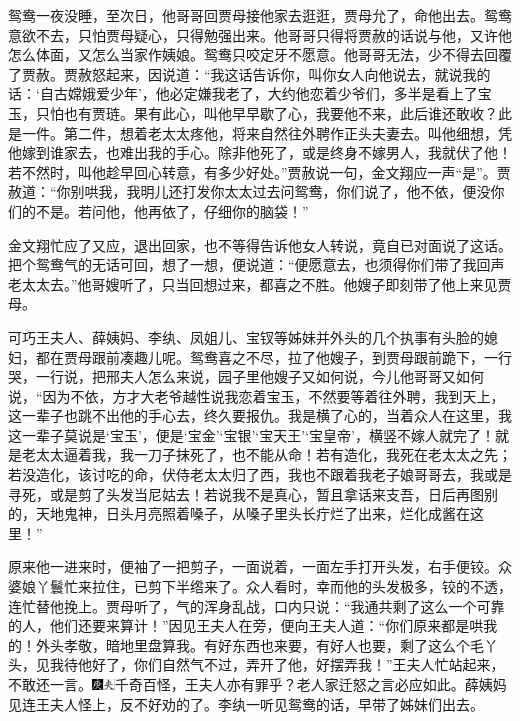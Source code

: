 鸳鸯一夜没睡，至次日，他哥哥回贾母接他家去逛逛，贾母允了，命他出去。鸳鸯意欲不去，只怕贾母疑心，只得勉强出来。他哥哥只得将贾赦的话说与他，又许他怎么体面，又怎么当家作姨娘。鸳鸯只咬定牙不愿意。他哥哥无法，少不得去回覆了贾赦。贾赦怒起来，因说道：“我这话告诉你，叫你女人向他说去，就说我的话：‘自古嫦娥爱少年’，他必定嫌我老了，大约他恋着少爷们，多半是看上了宝玉，只怕也有贾琏。果有此心，叫他早早歇了心，我要他不来，此后谁还敢收？此是一件。第二件，想着老太太疼他，将来自然往外聘作正头夫妻去。叫他细想，凭他嫁到谁家去，也难出我的手心。除非他死了，或是终身不嫁男人，我就伏了他！若不然时，叫他趁早回心转意，有多少好处。”贾赦说一句，金文翔应一声“是”。贾赦道：“你别哄我，我明儿还打发你太太过去问鸳鸯，你们说了，他不依，便没你们的不是。若问他，他再依了，仔细你的脑袋！”

金文翔忙应了又应，退出回家，也不等得告诉他女人转说，竟自已对面说了这话。把个鸳鸯气的无话可回，想了一想，便说道：“便愿意去，也须得你们带了我回声老太太去。”他哥嫂听了，只当回想过来，都喜之不胜。他嫂子即刻带了他上来见贾母。

可巧王夫人、薛姨妈、李纨、凤姐儿、宝钗等姊妹并外头的几个执事有头脸的媳妇，都在贾母跟前凑趣儿呢。鸳鸯喜之不尽，拉了他嫂子，到贾母跟前跪下，一行哭，一行说，把邢夫人怎么来说，园子里他嫂子又如何说，今儿他哥哥又如何说，“因为不依，方才大老爷越性说我恋着宝玉，不然要等着往外聘，我到天上，这一辈子也跳不出他的手心去，终久要报仇。我是横了心的，当着众人在这里，我这一辈子莫说是‘宝玉’，便是‘宝金’‘宝银’‘宝天王’‘宝皇帝’，横竖不嫁人就完了！就是老太太逼着我，我一刀子抹死了，也不能从命！若有造化，我死在老太太之先；若没造化，该讨吃的命，伏侍老太太归了西，我也不跟着我老子娘哥哥去，我或是寻死，或是剪了头发当尼姑去！若说我不是真心，暂且拿话来支吾，日后再图别的，天地鬼神，日头月亮照着嗓子，从嗓子里头长疔烂了出来，烂化成酱在这里！”

原来他一进来时，便袖了一把剪子，一面说着，一面左手打开头发，右手便铰。众婆娘丫鬟忙来拉住，已剪下半绺来了。众人看时，幸而他的头发极多，铰的不透，连忙替他挽上。贾母听了，气的浑身乱战，口内只说：“我通共剩了这么一个可靠的人，他们还要来算计！”因见王夫人在旁，便向王夫人道：“你们原来都是哄我的！外头孝敬，暗地里盘算我。有好东西也来要，有好人也要，剩了这么个毛丫头，见我待他好了，你们自然气不过，弄开了他，好摆弄我！”王夫人忙站起来，不敢还一言。{\includegraphics[width=3mm]{../Images/00004}\includegraphics[width=3mm]{../Images/00012}\footnotesize \kaishu 千奇百怪，王夫人亦有罪乎？老人家迁怒之言必应如此。}薛姨妈见连王夫人怪上，反不好劝的了。李纨一听见鸳鸯的话，早带了姊妹们出去。

